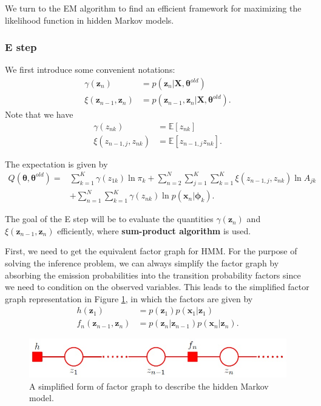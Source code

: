 \documentclass[a4paper]{book}
\renewcommand{\bf}{\mathbf}
\newcommand{\bb}{\mathbb}
\newcommand{\bs}{\boldsymbol}
\begin{document}
We turn to the EM algorithm to find an efficient framework for maximizing the likelihood function in hidden Markov models. 

\subsubsection{E step}
We first introduce some convenient notations:
\begin{align}
	\gamma(\bf{z}_n) &= p(\bf{z}_n|\bf{X},\bs{\theta}^{old}) \\
	\xi(\bf{z}_{n-1},\bf{z}_n) &= p(\bf{z}_{n-1},\bf{z}_n|\bf{X},\bs{\theta}^{old}).
\end{align}
Note that we have
\begin{align}
	\gamma(z_{nk}) &= \bb{E}[z_{nk}] \\
	\xi(z_{n-1,j},z_{nk}) &= \bb{E}[z_{n-1,j}z_{nk}].
\end{align}

The expectation is given by
\begin{align}
	Q(\bs{\theta,\theta}^{old}) = &\sum_{k=1}^K \gamma(z_{1k}) \ln \pi_k +\sum_{n=2}^N \sum_{j=1}^K \sum_{k=1}^K \xi(z_{n-1,j},z_{nk})\ln A_{jk} \\
	&+\sum_{n=1}^N \sum_{k=1}^K \gamma(z_{nk}) \ln p(\bf{x}_n|\bs{\phi}_k).
\end{align}

The goal of the E step will be to evaluate the quantities $\gamma(\bf{z}_n)$ and $\xi(\bf{z}_{n-1},\bf{z}_n)$ efficiently, where \textbf{sum-product algorithm} is used.

First, we need to get the equivalent factor graph for HMM. For the purpose of solving the inference problem, we can always simplify the factor graph by absorbing the emission probabilities into the transition probability factors since we need to condition on the observed variables. This leads to the simplified factor graph representation in Figure \ref{HMMFG}, in which the factors are given by
\begin{align}
	h(\bf{z}_1) &= p(\bf{z}_1)p(\bf{x}_1|\bf{z}_1) \\
	f_n(\bf{z}_{n-1},\bf{z}_n) &= p(\bf{z}_n|\bf{z}_{n-1})p(\bf{x}_n|\bf{z}_n).
\end{align}
\begin{figure}
	\centering
	\includegraphics[scale=.5]{HMMFG}
	\caption{A simplified form of factor graph to describe the hidden Markov model.} \label{HMMFG}
\end{figure}
\end{document}

